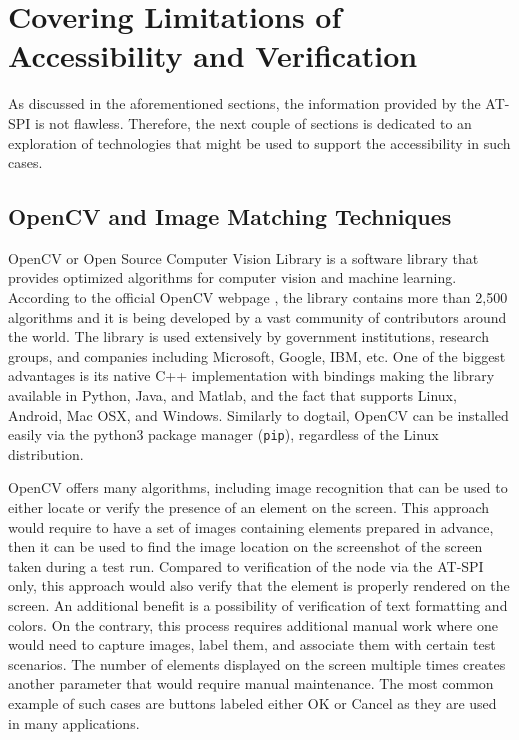 \section{Covering Limitations of Accessibility and Verification}
As discussed in the aforementioned sections, the information provided by the AT-SPI is not flawless. Therefore, the next couple of sections is dedicated to an exploration of technologies that might be used to support the accessibility in such cases.

\subsection{OpenCV and Image Matching Techniques}
OpenCV or Open Source Computer Vision Library is a software library that provides optimized algorithms for computer vision and machine learning. According to the official OpenCV webpage \cite{opencv}, the library contains more than 2,500 algorithms and it is being developed 
by a vast community of contributors around the world. The library is used extensively by government institutions, research groups, and companies including Microsoft, Google, IBM, etc. One of the biggest advantages is its native C++ implementation with bindings making the library available in Python, Java, and Matlab, and the fact that supports Linux, Android, Mac OSX, and Windows. Similarly to dogtail, OpenCV can be installed easily via the python3 package manager (\texttt{pip}), regardless of the Linux distribution. 

OpenCV offers many algorithms, including image recognition that can be used to either locate or verify the presence of an element on the screen. This approach would require to have a set of images containing elements prepared in advance, then it can be used to find the image location on the screenshot of the screen taken during a test run. Compared to verification of the node via the AT-SPI only, this approach would also verify that the element is properly rendered on the screen. An additional benefit is a possibility of verification of text formatting and colors. On the contrary, this process requires additional manual work where one would need to capture images, label them, and associate them with certain test scenarios. The number of elements displayed on the screen multiple times creates another parameter that would require manual maintenance. The most common example of such cases are buttons labeled either OK or Cancel as they are used in many applications.

